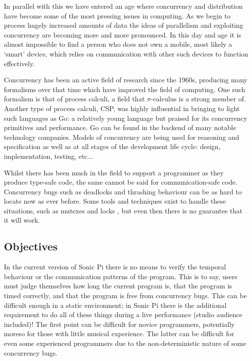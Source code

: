\documentclass[11pt, abstracton, twoside, titlepage=true]{scrartcl}
\begin{document}
In parallel with this we have entered an age where concurrency and 
distribution have become some of the most pressing issues in computing. As we 
begin to process hugely increased amounts of data the ideas of parallelism and 
exploiting concurrency are becoming more and more pronounced. In this day and age
it is almost impossible to find a person who does not own a mobile, most likely a 
`smart' device, which relies on communication with other such devices to function 
effectively. 

Concurrency has been an active field of research since the 1960s, producing
many formalisms over that time which have improved the field of computing. One 
such formalism is that of process calculi, a field that $\pi$-calculus is a strong
member of. Another type of process calculi, CSP, was highly influential in 
bringing to light such languages as Go: a relatively young language but praised
for its concurrency primitives and performance. Go can be found in the backend
of many notable technology companies. Models of concurrency are being used for
reasoning and specification as well as at all stages of the development life
cycle: design, implementation, testing, etc...

Whilst there has been much in the field to support a programmer as they produce
type-safe code, the same cannot be said for communication-safe code. Concurrency
bugs such as deadlocks and thrashing behaviour can be as hard to locate now as
ever before. Some tools and techniques exist to handle these situations, such as
mutexes and locks \cite{T95}, but even then there is no guarantee
that it will work. 

\subsection{Objectives}
In the current version of Sonic Pi \cite{sp} there is no means to verify the 
temporal behaviour or the communication patterns of the program. This is to say, 
users must judge themselves how long the current program is, that the program is 
timed correctly, and that the program is free from concurrency bugs. This can be 
difficult enough in a static environment; in Sonic Pi there is the additional 
requirement to do all of these things during a live performance (studio audience 
included)! The first point can be difficult for novice programmers, potentially 
moreso for those with little musical experience. The latter can be difficult for 
even some experienced programmers due to the non-deterministic nature of some 
concurrency bugs.
\end{document}

